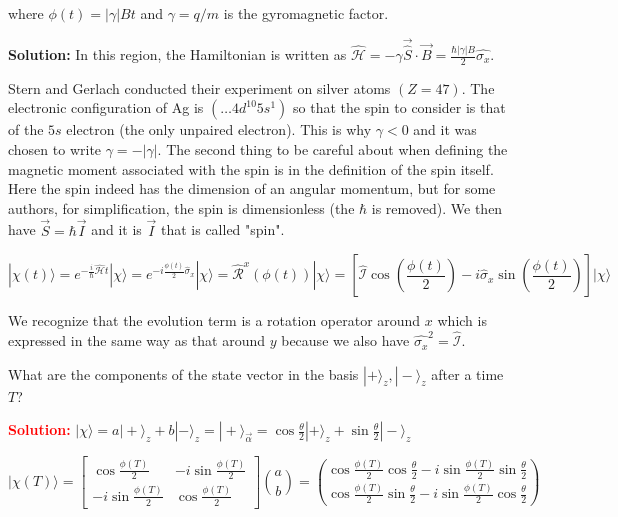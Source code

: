 \documentclass{article}
\begin{document}
\begin{enumerate}
    where $\phi(t) = |\gamma| B t$ and $\gamma = q / m$ is the gyromagnetic factor.

    {\color{red}\textbf{Solution:} In this region, the Hamiltonian is written as $\hat{\mathcal{H}} = -\gamma \vec{\hat{S}} \cdot \vec{B} = \frac{\hbar |\gamma| B}{2} \hat{\sigma_{x}}$.

    Stern and Gerlach conducted their experiment on silver atoms $(Z=47)$. The electronic configuration of Ag is $(\ldots 4 d^{10} 5 s^{1})$ so that the spin to consider is that of the $5s$ electron (the only unpaired electron). This is why $\gamma < 0$ and it was chosen to write $\gamma = -|\gamma|$. The second thing to be careful about when defining the magnetic moment associated with the spin is in the definition of the spin itself. Here the spin indeed has the dimension of an angular momentum, but for some authors, for simplification, the spin is dimensionless (the $\hbar$ is removed). We then have $\vec{S} = \hbar \vec{I}$ and it is $\vec{I}$ that is called "spin".

    $$
    |\chi(t)\rangle = e^{-\frac{i}{\hbar} \hat{\mathcal{H}} t}|\chi\rangle = e^{-i \frac{\phi(t)}{2} \hat{\sigma}_{x}}|\chi\rangle = \hat{\mathcal{R}}^{x}(\phi(t))|\chi\rangle = \left[\hat{\mathcal{I}} \cos \left(\frac{\phi(t)}{2}\right) - i \hat{\sigma}_{x} \sin \left(\frac{\phi(t)}{2}\right)\right]|\chi\rangle
    $$

    We recognize that the evolution term is a rotation operator around $x$ which is expressed in the same way as that around $y$ because we also have $\hat{\sigma_{x}}^{2} = \hat{\mathcal{I}}$.

    \item What are the components of the state vector in the basis $|+\rangle_{z}, |-\rangle_{z}$ after a time $T$?

    \textbf{\textcolor{red}{Solution:}} $|\chi\rangle = a|+\rangle_{z} + b|-\rangle_{z} = |+\rangle_{\vec{\alpha}} = \cos \frac{\theta}{2}|+\rangle_{z} + \sin \frac{\theta}{2}|-\rangle_{z}$

    $$
    |\chi(T)\rangle = \left[\begin{array}{cc}
    \cos \frac{\phi(T)}{2} & -i \sin \frac{\phi(T)}{2} \\
    -i \sin \frac{\phi(T)}{2} & \cos \frac{\phi(T)}{2}
    \end{array}\right]\binom{a}{b} = \binom{\cos \frac{\phi(T)}{2} \cos \frac{\theta}{2} - i \sin \frac{\phi(T)}{2} \sin \frac{\theta}{2}}{\cos \frac{\phi(T)}{2} \sin \frac{\theta}{2} - i \sin \frac{\phi(T)}{2} \cos \frac{\theta}{2}}
    $$}


\end{enumerate}
\end{document}
